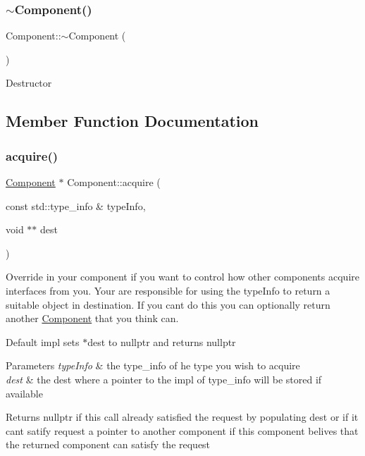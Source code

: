 \subsubsection{\texorpdfstring{$\sim$\+Component()}{~Component()}}
{\footnotesize\ttfamily Component\+::$\sim$\+Component (\begin{DoxyParamCaption}{ }\end{DoxyParamCaption})\hspace{0.3cm}{\ttfamily [virtual]}}

Destructor 

\subsection{Member Function Documentation}
\mbox{\label{classtheoria_1_1core_1_1Component_a18744abc83e088af3c3d42e0a22c35e3}} 
\subsubsection{\texorpdfstring{acquire()}{acquire()}}
{\footnotesize\ttfamily \hyperlink{classtheoria_1_1core_1_1Component}{Component} $\ast$ Component\+::acquire (\begin{DoxyParamCaption}\item[{const std\+::type\+\_\+info \&}]{type\+Info,  }\item[{void $\ast$$\ast$}]{dest }\end{DoxyParamCaption})\hspace{0.3cm}{\ttfamily [virtual]}}

Override in your component if you want to control how other components acquire interfaces from you. Your are responsible for using the type\+Info to return a suitable object in destination. If you can\textquotesingle{}t do this you can optionally return another \hyperlink{classtheoria_1_1core_1_1Component}{Component} that you think can.

Default impl sets $\ast$dest to nullptr and returns nullptr


\begin{DoxyParams}{Parameters}
{\em type\+Info} & the type\+\_\+info of he type you wish to acquire \\
\hline
{\em dest} & the dest where a pointer to the impl of type\+\_\+info will be stored if available \\
\hline
\end{DoxyParams}
\begin{DoxyReturn}{Returns}
nullptr if this call already satisfied the request by populating dest or if it can\textquotesingle{}t satify request a pointer to another component if this component belives that the returned component can satisfy the request 
\end{DoxyReturn}


